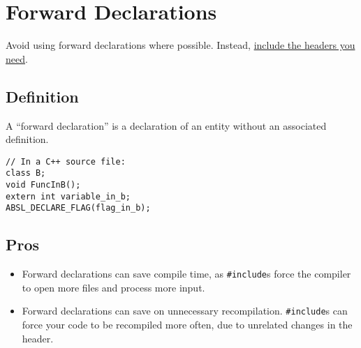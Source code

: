 
\section{Forward Declarations}\label{sec:forward_declarations}
Avoid using forward declarations where possible. Instead, \hyperref[sec:include-what-you-use]{include the headers you need}.

\subsection{Definition}\label{subsec:definition}
A \enquote{forward declaration} is a declaration of an entity without an associated definition.
\begin{verbatim}
// In a C++ source file:
class B;
void FuncInB();
extern int variable_in_b;
ABSL_DECLARE_FLAG(flag_in_b);
\end{verbatim}

\subsection{Pros}
\begin{itemize}
    \item Forward declarations can save compile time, as \texttt{#include}s force the compiler to open more files and process more input.
    \item Forward declarations can save on unnecessary recompilation. \texttt{#include}s can force your code to be recompiled more often, due to unrelated changes in the header.
\end{itemize}
